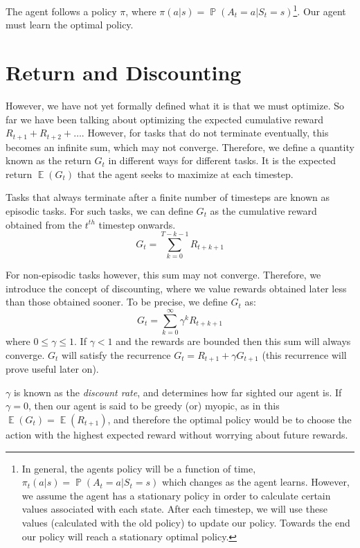 \documentclass[12pt]{report}
\begin{document}
The agent follows a policy $\pi$, where $\pi(a | s) = \mathop{\mathbb{P}}(A_{t} = a | S_{t} = s)$\footnote{In general, the agents policy will be a function of time, $\pi_{t}(a | s) = \mathop{\mathbb{P}}(A_{t} = a | S_{t} = s)$ which changes as the agent learns. However, we assume the agent 
has a stationary policy in order to calculate certain values associated with each state. After each timestep, we will use these values (calculated with the old policy) to update our policy. Towards the end our policy will reach a stationary optimal policy.}. Our agent must learn the optimal policy.

\section{Return and Discounting}
However, we have not yet formally defined what it is that we must optimize. So far we have been talking about optimizing the expected cumulative reward $R_{t + 1} + R_{t + 2} + \dots$. However, for tasks that do not terminate eventually, this becomes an infinite sum, which may not converge.
Therefore, we define a quantity known as the return $G_{t}$ in different ways for different tasks. It is the expected return $\mathop{\mathbb{E}}(G_{t})$ that the agent seeks to maximize at each timestep.

Tasks that always terminate after a finite number of timesteps are known as episodic tasks. For such tasks, we can define $G_{t}$ as the cumulative reward obtained from the $t^{th}$ timestep onwards.
\begin{equation}
    G_{t} = \sum\limits_{k = 0}^{T - k - 1} R_{t + k + 1}
\end{equation}

For non-episodic tasks however, this sum may not converge. Therefore, we introduce the concept of discounting, where we value rewards obtained later less than those obtained sooner. To be precise, we define $G_{t}$ as:
\begin{equation}
    G_{t} = \sum\limits_{k = 0}^{\infty} \gamma^{k}R_{t + k + 1}
\end{equation}
where $0 \leq \gamma \leq 1$. If $\gamma < 1$ and the rewards are bounded then this sum will always converge. $G_{t}$ will satisfy the recurrence $G_{t} = R_{t + 1} + \gamma G_{t + 1}$ (this recurrence will prove useful later on).

$\gamma$ is known as the \textit{discount rate}, and determines how far sighted our agent is. If $\gamma = 0$, then our 
agent is said to be greedy (or) myopic, as in this $\mathop{\mathbb{E}}(G_{t}) = \mathop{\mathbb{E}}(R_{t + 1})$, and therefore the optimal policy would be to choose the action with the highest expected reward without worrying about future rewards.
\end{document}
